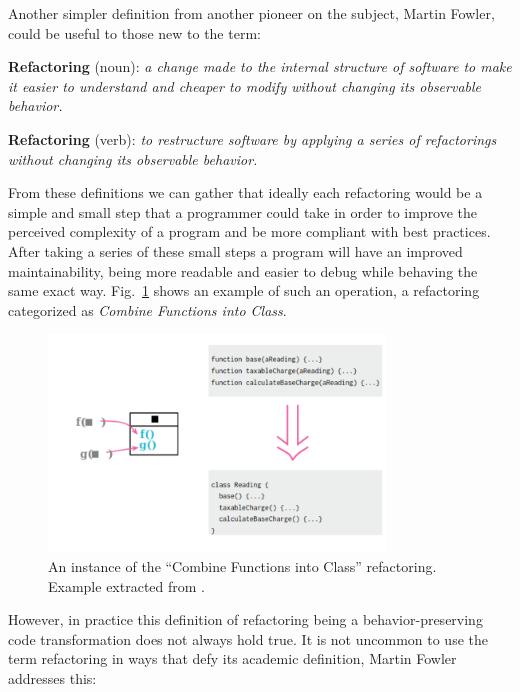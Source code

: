Another simpler definition from another pioneer on the subject, Martin Fowler, could be useful to those new to the term:

\begin{myquote}
\textbf{Refactoring} (noun): \textit{a change made to the internal structure of software to make it easier to understand and cheaper to modify without changing its observable behavior.} \\\citet{martinfowler}
\end{myquote}
\begin{myquote}
\textbf{Refactoring} (verb): \textit{to restructure software by applying a series of refactorings without changing its observable behavior.} \\\citet{martinfowler}
\end{myquote}


From these definitions we can gather that ideally each refactoring would be a simple and small step that a programmer could take in order to improve the perceived complexity of a program and be more compliant with best practices. After taking a series of these small steps a program will have an improved maintainability, being more readable and easier to debug while behaving the same exact way. Fig.~\ref{ilustracao_refac_func2class} shows an example of such an operation, a refactoring categorized as \textit{Combine Functions into Class}.

\begin{figure}[!ht]
\centerline{\includegraphics[width=0.8\textwidth]{figuras/class_extract.png}   }
\caption{An instance of the ``Combine Functions into Class'' refactoring. Example extracted from  \citep{martinfowler}.}
\label{ilustracao_refac_func2class}
\end{figure}


However, in practice this definition of refactoring being a behavior-preserving code transformation does not always hold true. It is not uncommon to use the term refactoring in ways that defy its academic definition, Martin Fowler addresses this:



